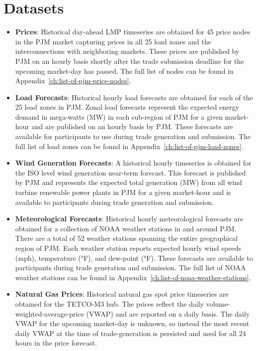 \section{Datasets}\label{sec:datasets}

\begin{itemize}
    \item \textbf{Prices}: Historical day-ahead LMP timeseries are obtained for 45 price nodes in the PJM market
    capturing prices in all 25 load zones and the interconnections with neighboring markets.
    These prices are published by PJM on an hourly basis shortly after the trade submission deadline for the upcoming
    market-day has passed.
    The full list of nodes can be found in Appendix~\ref{ch:list-of-pjm-price-nodes}.

    \item \textbf{Load Forecasts}: Historical hourly load forecasts are obtained for each of the 25 load zones in PJM\@.
    Zonal load forecasts represent the expected energy demand in mega-watts (MW) in each sub-region of PJM for a given
    market-hour and are published on an hourly basis by PJM\@.
    These forecasts are available for participants to use during trade generation and submission.
    The full list of load zones can be found in Appendix~\ref{ch:list-of-pjm-load-zones}.

    \item \textbf{Wind Generation Forecasts}: A historical hourly timeseries is obtained for the ISO level wind generation
    near-term forecast.
    This forecast is published by PJM and represents the expected total generation (MW) from all wind turbine renewable
    power plants in PJM for a given market-hour and is available to participants during trade generation and submission.

    \item \textbf{Meteorological Forecasts}: Historical hourly meteorological forecasts are obtained for a collection
    of NOAA weather stations in and around PJM\@.
    There are a total of 52 weather stations spanning the entire geographical region of PJM\@.
    Each weather station reports expected hourly wind speeds (mph), temperature (°F), and dew-point (°F).
    These forecasts are available to participants during trade generation and submission.
    The full list of NOAA weather stations can be found in Appendix~\ref{ch:list-of-noaa-weather-stations}.

    \item \textbf{Natural Gas Prices}: Historical natural gas spot price timeseries are obtained for the TETCO-M3 hub.
    The prices reflect the daily volume-weighted-average-price (VWAP) and are reported on a daily basis.
    The daily VWAP for the upcoming market-day is unknown, so instead the most recent daily VWAP at the time of
    trade-generation is persisted and used for all 24 hours in the price forecast.
\end{itemize}

